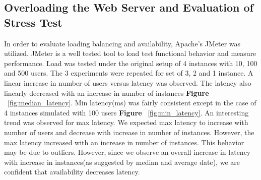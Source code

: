 \documentclass[12pt]{article}
\begin{document}
\subsection{Overloading the Web Server and Evaluation of Stress Test} In order to 
evaluate loading balancing and availability, Apache's JMeter was utilized. JMeter 
is a well tested tool to load test functional behavior and measure 
performance\cite{apache}. Load was tested under the original setup of 4 instances 
with 10, 100 and 500 users. The 3
experiments were repeated for set of 3, 2 and 1 instance. A linear increase in
number of users versus latency was observed. The latency also linearly decreased
with an increase in number of instances \textbf{Figure} ~\ref{fig:median_latency}. Min
latency(ms) was fairly consistent except in the case of 4 instances simulated
with 100 users \textbf{Figure} ~\ref{fig:min_latency}. An interesting trend was observed for max
latency. We expected max latency to increase with number of users and decrease
with increase in number of instances. However, the max latency increased with an
increase in number of instances. This behavior may be due to outliers. However,
since we observe an overall increase in latency with increase in instances(as
suggested by median and average date), we are confident that availability
decreases latency.  
\end{document}
